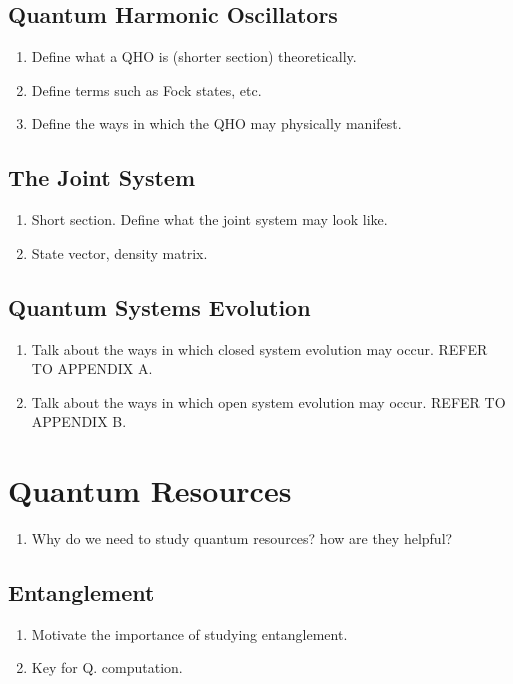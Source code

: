 \documentclass{article}
\begin{document}
\subsection{Quantum Harmonic Oscillators}
\begin{enumerate}
    \item Define what a QHO is (shorter section) theoretically.
    \item Define terms such as Fock states, etc.
    \item Define the ways in which the QHO may physically manifest.
\end{enumerate}
\subsection{The Joint System}
\begin{enumerate}
    \item Short section. Define what the joint system may look like. 
    \item State vector, density matrix. 
\end{enumerate}
\subsection{Quantum Systems Evolution}
\begin{enumerate}
    \item Talk about the ways in which closed system evolution may occur. REFER TO APPENDIX A.
    \item Talk about the ways in which open system evolution may occur. REFER TO APPENDIX B. 
\end{enumerate}
\newpage
\section{Quantum Resources}
\begin{enumerate}
    \item Why do we need to study quantum resources? how are they helpful?
\end{enumerate}
\subsection{Entanglement}
\begin{enumerate}
    \item Motivate the importance of studying entanglement. 
    \item Key for Q. computation.
\end{enumerate}
\end{document}

